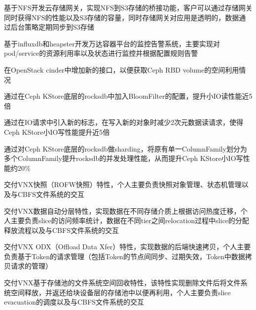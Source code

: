 \documentclass{CurriculumVitae} %
\begin{document}
\begin{CJK}{UTF8}{gbsn}


\begin{achievements}
\item 基于NFS开发云存储网关，实现NFS到S3存储的桥接功能，客户可以通过存储网关同时获得NFS的性能以及S3存储的容量，同时存储网关对应用是透明的，数据通过后台策略定期同步到S3存储
\item 基于influxdb和heapster开发万达容器平台的监控告警系统，主要实现对pod/service的资源利用率以及状态进行监控并根据配置规则告警
\item 在OpenStack cinder中增加新的接口，以便获取Ceph RBD volume的空间利用情况
\end{achievements}

\begin{achievements}
\item 通过在Ceph KStore底层的rocksdb中加入BloomFilter的配置，提升小IO读性能近5倍
\item 通过在IO请求中引入新的标志，在写入新的对象时减少2次元数据读请求，使得Ceph KStore小IO写性能提升近5倍
\item 通过对Ceph KStore底层的rocksdb做sharding，将原有单一ColumnFamily划分为多个ColumnFamily提升rocksdb的并发处理性能，从而提升Ceph KStore小IO写性能约20\%
\end{achievements}

\begin{achievements}
\item 交付VNX快照（ROFW快照）特性，个人主要负责快照对象管理、状态机管理以及与CBFS文件系统的交互
\item 交付VNX数据自动分层特性，实现数据在不同存储介质上根据访问热度迁移，个人主要负责slice的访问频率统计，数据在不同tier之间relocation过程中slice的分配释放流程以及与CBFS文件系统的交互
\item 交付VNX ODX（Offload Data Xfer）特性，实现数据的后端快速拷贝，个人主要负责基于Token的请求管理（包括Token的节点间同步、过期失效，Token中数据拷贝请求的管理）
\item 交付VNX基于存储池的文件系统空间回收特性，该特性实现删除文件后将文件系统空间释放，并返还给块设备层的存储池中以便再利用，个人主要负责slice evacuation的调度以及与CBFS文件系统的交互
\end{achievements}


\end{CJK}
\end{document}
